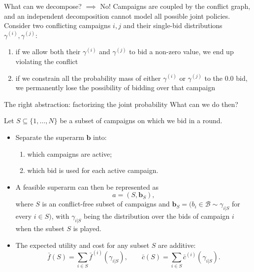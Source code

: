 \begin{frame}{What can we decompose?}
    $\implies$ No! Campaigns are coupled by the conflict graph, and an independent decomposition cannot model all possible joint policies. Consider two conflicting campaigns $i, j$ and their single-bid distributions $\gamma^{(i)}, \gamma^{(j)}$:
    \begin{enumerate}
        \item if we allow both their $\gamma^{(i)}$ and $\gamma^{(j)}$ to bid a non-zero value, we end up violating the conflict
        \item if we constrain all the probability mass of either $\gamma^{(i)}$ or $\gamma^{(j)}$ to the $0.0$ bid, we permanently lose the possibility of bidding over that campaign
    \end{enumerate}
\end{frame}

\begin{frame}{The right abstraction: factorizing the joint probability}
    What can we do then?

    Let $S \subseteq \{1, \ldots, N\}$ be a subset of campaigns on which we bid in a round.
    \begin{itemize}
        \item Separate the superarm $\mathbf{b}$ into:
        \begin{enumerate}
            \item which campaigns are active;
            \item which bid is used for each active campaign.
        \end{enumerate}

        \item A feasible superarm can then be represented as
        \[a = (S,\mathbf b_S),\]
        where $S$ is an conflict-free subset of campaigns and
        $\mathbf{b}_S = (b_i \in \mathcal B \sim \gamma_{i | S}$ for every $i \in S)$, with $\gamma_{i | S}$ being the distribution over the bids of campaign $i$ when the subset $S$ is played.

        \item The expected utility and cost for any subset $S$ are additive:
        \[\bar{f}(S) = \sum_{i \in S} \bar{f}^{(i)}(\gamma_{i|S}), \qquad \bar{c}(S) = \sum_{i \in S} \bar{c}^{(i)}(\gamma_{i|S}).\]
    \end{itemize}
\end{frame}

